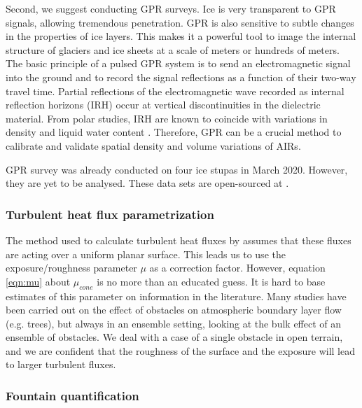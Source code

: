 Second, we suggest conducting \ac{GPR} surveys. Ice is very transparent to \ac{GPR} signals, allowing tremendous
penetration. \ac{GPR} is also sensitive to subtle changes in the properties of ice layers. This makes it a
powerful tool to image the internal structure of glaciers and ice sheets at a scale of meters or hundreds of
meters. The basic principle of a pulsed \ac{GPR} system is to send an electromagnetic signal into the ground and
to record the signal reflections as a function of their two-way travel time. Partial reflections of the
electromagnetic wave recorded as internal reflection horizons (IRH) occur at vertical discontinuities in the
dielectric material. From polar studies, IRH are known to coincide with variations in density and liquid water
content \citep{forster2014extensive}. Therefore, \ac{GPR} can be a crucial method to calibrate and validate spatial density
and volume variations of \ac{AIRs}.

\ac{GPR} survey was already conducted on four ice stupas in March 2020. However, they are yet to be analysed.
These data sets are open-sourced at \citet{balasubramanian_suryanarayanan_2022_7056646}.

\subsubsection{Turbulent heat flux parametrization}


The method used to calculate turbulent heat fluxes by \citet{garrattAtmosphericBoundaryLayer1992} assumes that
these fluxes are acting over a uniform planar surface. This leads us to use the exposure/roughness parameter
$\mu$ as a correction factor. However, equation \ref{eqn:mu} about $\mu_{cone}$ is no more than an educated guess. It
is hard to base estimates of this parameter on information in the literature. Many studies have been carried out
on the effect of obstacles on atmospheric boundary layer flow (e.g. trees), but always in an ensemble setting,
looking at the bulk effect of an ensemble of obstacles. We deal with a case of a single obstacle in open
terrain, and we are confident that the roughness of the surface and the exposure will lead to larger turbulent
fluxes.

\subsubsection{Fountain quantification}

